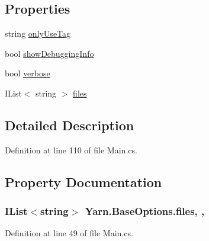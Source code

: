 \subsection*{Properties}
\begin{DoxyCompactItemize}
\item 
string \hyperlink{a00102_a8b30c1b7fb1b74eae455a568c1024b3d}{only\-Use\-Tag}
\item 
bool \hyperlink{a00040_a89964ea17bd19caf00cb5bff563ed01c}{show\-Debugging\-Info}
\item 
bool \hyperlink{a00040_ada4d83d1756918f362d55f6649b82b17}{verbose}
\item 
I\-List$<$ string $>$ \hyperlink{a00040_aa93cbb1bc1d5328e0a417012621e92d2}{files}
\end{DoxyCompactItemize}


\subsection{Detailed Description}


Definition at line 110 of file Main.\-cs.



\subsection{Property Documentation}
\hypertarget{a00040_aa93cbb1bc1d5328e0a417012621e92d2}{
\subsubsection[{files}]{\setlength{\rightskip}{0pt plus 5cm}I\-List$<$string$>$ Yarn.\-Base\-Options.\-files\hspace{0.3cm}{\ttfamily [get]}, {\ttfamily [set]}, {\ttfamily [inherited]}}}\label{a00040_aa93cbb1bc1d5328e0a417012621e92d2}


Definition at line 49 of file Main.\-cs.



